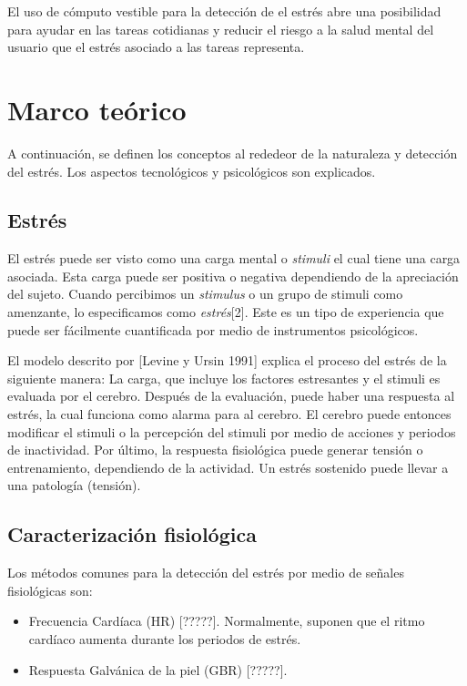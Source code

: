 \documentclass[letterpaper,12pt]{cicese}
\begin{document}
			El uso de c\'omputo vestible para la detecci\'on de el estr\'es abre una posibilidad para ayudar en las tareas cotidianas y reducir el riesgo a la salud mental
			del usuario que el estr\'es asociado a las tareas representa.
		\chapter{Marco te\'orico} 
			A continuaci\'on, se definen los conceptos al rededeor de la naturaleza y detecci\'on del estr\'es. Los aspectos tecnol\'ogicos y psicol\'ogicos son explicados.
			\section{Estr\'es}
				El estr\'es puede ser visto como una carga mental o \emph{stimuli} el cual tiene una carga asociada. Esta carga puede ser positiva o negativa dependiendo
				de la apreciaci\'on del sujeto. Cuando percibimos un \emph{stimulus} o un grupo de {stimuli} como amenzante, lo especificamos como \emph{estr\'es}[2].
				Este es un tipo de experiencia que puede ser f\'acilmente cuantificada por medio de instrumentos psicol\'ogicos.
				
				El modelo descrito por [Levine y Ursin 1991] explica el proceso del estr\'es de la siguiente manera: La carga, que incluye los factores estresantes y el
				stimuli es evaluada por el cerebro. Despu\'es de la evaluaci\'on, puede haber una respuesta al estr\'es, la cual funciona como alarma para al cerebro.
				El cerebro puede entonces modificar el stimuli o la percepci\'on del stimuli por medio de acciones y periodos de inactividad. Por \'ultimo, la respuesta
				fisiol\'ogica puede generar tensi\'on  o entrenamiento, dependiendo de la actividad. Un estr\'es sostenido puede llevar a una patolog\'ia (tensi\'on).
			\section{Caracterizaci\'on fisiol\'ogica}
				Los m\'etodos comunes para la detecci\'on del estr\'es por medio de se\~nales fisiol\'ogicas son: 
					\begin{itemize}
						\item Frecuencia Card\'iaca (HR) [?????]. Normalmente, suponen que el ritmo card\'iaco aumenta durante los periodos de estr\'es. 
						\item Respuesta Galv\'anica de la piel (GBR) [?????]. 
					\end{itemize}
\end{document}

